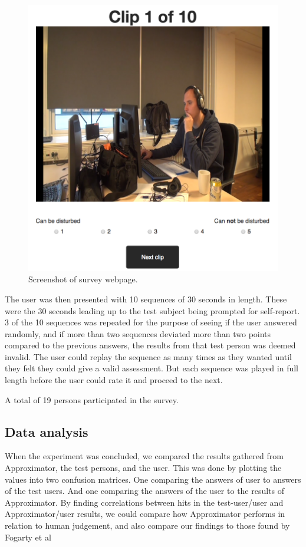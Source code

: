 \documentclass{sigchi}
\begin{document}
\begin{figure}
  \centering
  \includegraphics[width=\columnwidth]{figures/webpage_screenshot.png}
  \caption{Screenshot of survey webpage.}
  \label{fig:webpage}
\end{figure}

The user was then presented with 10 sequences of 30 seconds in length.
These were the 30 seconds leading up to the test subject being prompted for self-report.
3 of the 10 sequences was repeated for the purpose of seeing if the user answered randomly, and if more than two sequences deviated more than two points compared to the previous answers, the results from that test person was deemed invalid.
The user could replay the sequence as many times as they wanted until they felt they could give a valid assessment.
But each sequence was played in full length before the user could rate it and proceed to the next.

A total of 19 persons participated in the survey.

\subsection{Data analysis}
When the experiment was concluded, we compared the results gathered from Approximator, the test persons, and the user.
This was done by plotting the values into two confusion matrices.
One comparing the answers of user to answers of the test users.
And one comparing the answers of the user to the results of Approximator.
By finding correlations between hits in the test-user/user and Approximator/user results, we could compare how Approximator performs in relation to human judgement, and also compare our findings to those found by Fogarty et al \cite{fogarty2005predicting}
\end{document}
